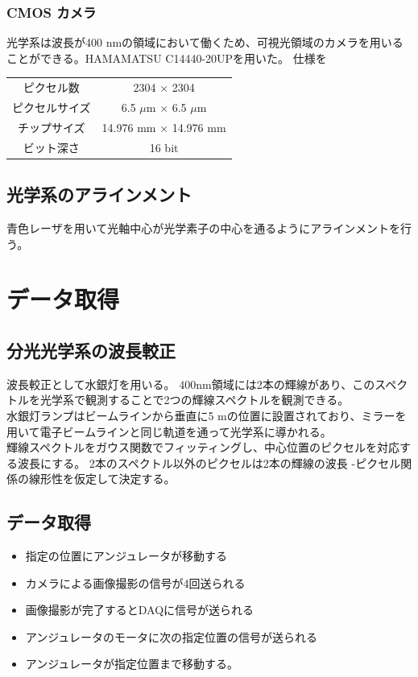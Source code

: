 \documentclass[a4paper,11pt,uplatex]{jsbook}
\begin{document}
\subsubsection{CMOS カメラ}
光学系は波長が400 nmの領域において働くため、可視光領域のカメラを用いることができる。HAMAMATSU C14440-20UPを用いた。
仕様を
\begin{table}[h]
\centering
\begin{tabular}{c|c}
  ピクセル数 & 2304 $\times$ 2304\\
  ピクセルサイズ & 6.5 $\mu$m $\times$ 6.5 $\mu$m\\
  チップサイズ & 14.976 mm $\times$ 14.976 mm\\
  ビット深さ & 16 bit\\ 
\end{tabular}
\end{table}

\subsection{光学系のアラインメント}
青色レーザを用いて光軸中心が光学素子の中心を通るようにアラインメントを行う。

\section{データ取得}


\subsection{分光光学系の波長較正}
波長較正として水銀灯を用いる。
$400 \text{nm}$領域には2本の輝線があり、このスペクトルを光学系で観測することで2つの輝線スペクトルを観測できる。\\
水銀灯ランプはビームラインから垂直に5 mの位置に設置されており、ミラーを用いて電子ビームラインと同じ軌道を通って光学系に導かれる。\\

輝線スペクトルをガウス関数でフィッティングし、中心位置のピクセルを対応する波長にする。
2本のスペクトル以外のピクセルは2本の輝線の波長 -ピクセル関係の線形性を仮定して決定する。
\subsection{データ取得}
\begin{itemize}
  \item 指定の位置にアンジュレータが移動する
  \item カメラによる画像撮影の信号が4回送られる
  \item 画像撮影が完了するとDAQに信号が送られる
  \item アンジュレータのモータに次の指定位置の信号が送られる
  \item アンジュレータが指定位置まで移動する。
\end{itemize}
\end{document}

